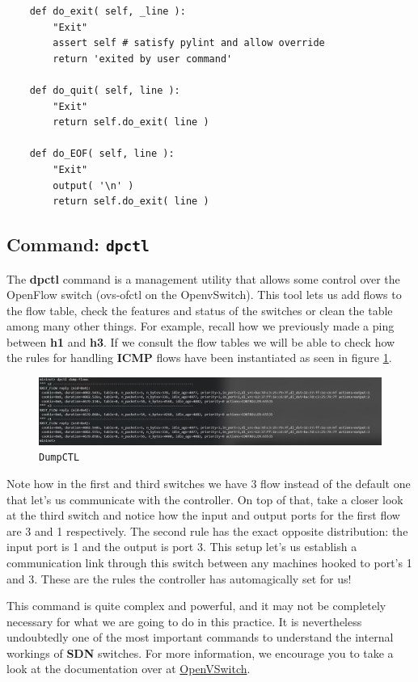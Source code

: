 \documentclass[12pt]{article}
\newcommand{\newpar} {
    \vskip 1cm
}
\begin{document}
		\begin{verbatim}
	def do_exit( self, _line ):
		"Exit"
		assert self # satisfy pylint and allow override
		return 'exited by user command'

	def do_quit( self, line ):
		"Exit"
		return self.do_exit( line )

	def do_EOF( self, line ):
		"Exit"
		output( '\n' )
		return self.do_exit( line )
		\end{verbatim}

	\subsection{Command: \texttt{dpctl}}
		The \textbf{dpctl} command is a management utility that allows some control over the OpenFlow switch (ovs-ofctl on the OpenvSwitch). This tool lets us add flows to the flow table, check the features and status of the switches or clean the table among many other things. For example, recall how we previously made a ping between \textbf{h1} and \textbf{h3}. If we consult the flow tables we will be able to check how the rules for handling \textbf{ICMP} flows have been instantiated as seen in figure \ref{f:dpctl}.

		\begin{figure}[!htb]
			\centering
			\includegraphics[width=\linewidth]{dpctl.png}
			\caption{\texttt{DumpCTL}}
			\label{f:dpctl}
		\end{figure}

		Note how in the first and third switches we have 3 flow instead of the default one that let's us communicate with the controller. On top of that, take a closer look at the third switch and notice how the input and output ports for the first flow are 3 and 1 respectively. The second rule has the exact opposite distribution: the input port is 1 and the output is port 3. This setup let's us establish a communication link through this switch between any machines hooked to port's 1 and 3. These are the rules the controller has automagically set for us!
		\newpar
		This command is quite complex and powerful, and it may not be completely necessary for what we are going to do in this practice. It is nevertheless undoubtedly one of the most important commands to understand the internal workings of \textbf{SDN} switches. For more information, we encourage you to take a look at the documentation over at \href{http://www.openvswitch.org/support/dist-docs/ovs-ofctl.8.txt}{OpenVSwitch}.
\end{document}
